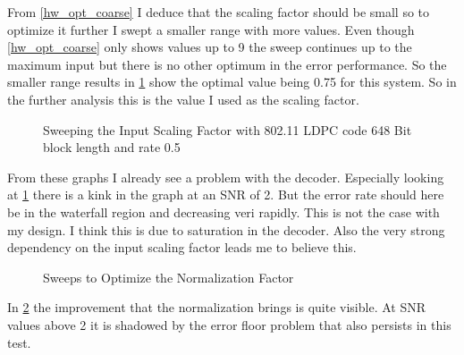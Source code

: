 From \cref{hw_opt_coarse} I deduce that the scaling factor should be small so to optimize it further I swept a smaller range with more values. Even though \cref{hw_opt_coarse} only shows values up to 9 the sweep continues up to the maximum input but there is no other optimum in the error performance. So the smaller range results in \cref{hw_opt_fine} show the optimal value being 0.75 for this system. So in the further analysis this is the value I used as the scaling factor.
\hwoptbitbal
\begin{figure}
    \centering
    \caption{Sweeping the Input Scaling Factor with 802.11 LDPC code 648 Bit block length and rate 0.5}
    \label{hw_opt_fine}
\end{figure}
From these graphs I already see a problem with the decoder. Especially looking at \cref{hw_opt_fine} there is a kink in the graph at an SNR of 2. But the error rate should here be in the waterfall region and decreasing veri rapidly. This is not the case with my design. I think this is due to saturation in the decoder. Also the very strong dependency on the input scaling factor leads me to believe this.
\begin{figure}
    \centering
    \caption{Sweeps to Optimize the Normalization Factor}
    \label{hw_opt_norm}
\end{figure}
In \cref{hw_opt_norm} the improvement that the normalization brings is quite visible. At SNR values above 2 it is shadowed by the error floor problem that also persists in this test.

